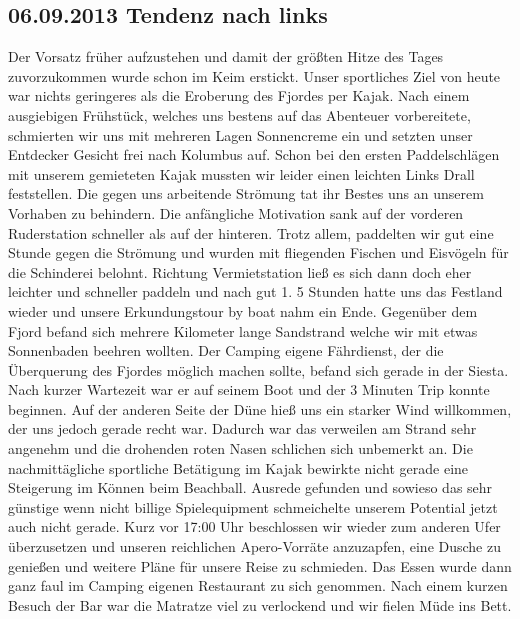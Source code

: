 \subsection{06.09.2013 Tendenz nach links} 
Der Vorsatz früher aufzustehen und damit der größten Hitze des Tages zuvorzukommen wurde schon im Keim erstickt.
Unser sportliches Ziel von heute war nichts geringeres als die Eroberung des Fjordes per Kajak.
Nach einem ausgiebigen Frühstück, welches uns bestens auf das Abenteuer vorbereitete, schmierten wir uns mit mehreren Lagen Sonnencreme ein und setzten unser Entdecker Gesicht frei nach Kolumbus auf.
Schon bei den ersten Paddelschlägen mit unserem gemieteten Kajak mussten wir leider einen leichten Links Drall feststellen.
Die gegen uns arbeitende Strömung tat ihr Bestes uns an unserem Vorhaben zu behindern.
Die anfängliche Motivation sank auf der vorderen Ruderstation schneller als auf der hinteren.
Trotz allem, paddelten wir gut eine Stunde gegen die Strömung und wurden mit fliegenden Fischen und Eisvögeln für die Schinderei belohnt.
Richtung Vermietstation ließ es sich dann doch eher leichter und schneller paddeln und nach gut 1.
5 Stunden hatte uns das Festland wieder und unsere Erkundungstour by boat nahm ein Ende.
Gegenüber dem Fjord befand sich  mehrere Kilometer lange Sandstrand welche wir mit etwas Sonnenbaden beehren wollten.
Der Camping eigene Fährdienst, der die Überquerung des Fjordes möglich machen sollte, befand sich gerade in der Siesta.
Nach kurzer Wartezeit war er auf seinem Boot und der 3 Minuten Trip konnte beginnen.
Auf der anderen Seite der Düne hieß uns ein starker Wind willkommen, der uns jedoch gerade recht war.
Dadurch war das verweilen am Strand sehr angenehm und die drohenden roten Nasen schlichen sich unbemerkt an.
Die nachmittägliche sportliche Betätigung im Kajak bewirkte nicht gerade eine Steigerung im Können beim Beachball.
Ausrede gefunden und sowieso das sehr günstige wenn nicht billige Spielequipment schmeichelte unserem Potential jetzt auch nicht gerade.
Kurz vor 17:00 Uhr beschlossen wir wieder zum anderen Ufer überzusetzen und unseren reichlichen Apero-Vorräte anzuzapfen, eine Dusche zu genießen und weitere Pläne für unsere Reise zu schmieden.
Das Essen wurde dann ganz faul im Camping eigenen Restaurant zu sich genommen.
Nach einem kurzen Besuch der Bar war die Matratze viel zu verlockend und wir fielen Müde ins Bett.

